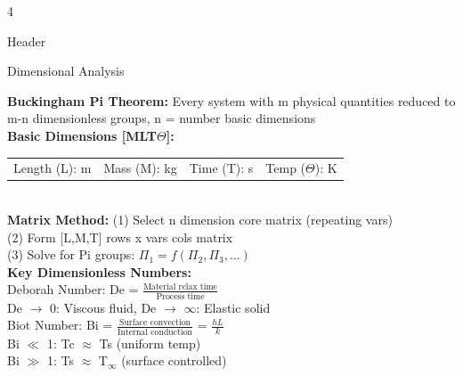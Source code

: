 \documentclass[10pt]{article}
\begin{document}
\begin{multicols*}{4}
\begin{conceptbox}[v3]{Header}
	\end{conceptbox}

	\begin{conceptbox}[r1]{Dimensional Analysis}


		\textbf{Buckingham Pi Theorem:} Every system with m physical quantities reduced to m-n dimensionless groups, n = number basic dimensions\\

		\textbf{Basic Dimensions [MLT$\Theta$]:}\\
		\begin{minipage}{0.95\textwidth}
			\tiny
			\noindent
			\begin{tabular}{cccc}
				Length (L): m & %
				Mass (M): kg  & %
				Time (T): s   & %
				Temp ($\Theta$): K
			\end{tabular}
		\end{minipage}\\

		\textbf{Matrix Method:}
		(1) Select n dimension core matrix (repeating vars)\\
		(2) Form [L,M,T] rows x vars cols matrix\\
		(3) Solve for Pi groups: $\Pi_1 = f(\Pi_2, \Pi_3, ...)$\\

		\textbf{Key Dimensionless Numbers:}\\
		Deborah Number: De = $\frac{\text{Material relax time}}{\text{Process time}}$\\
		De $\to$ 0: Viscous fluid, De $\to$ $\infty$: Elastic solid\\

		Biot Number: Bi = $\frac{\text{Surface convection}}{\text{Internal conduction}}$ = $\frac{hL}{k}$\\

		Bi $\ll$ 1: Tc $\approx$ Ts (uniform temp)\\

		Bi $\gg$ 1: Ts $\approx$ T$_\infty$ (surface controlled)\\


\end{conceptbox}
\end{multicols*}
\end{document}
